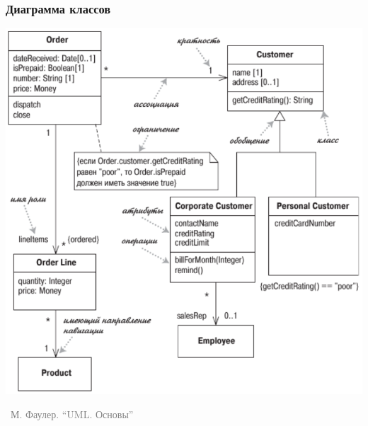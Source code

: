 \documentclass[xetex,mathserif,serif]{beamer}
\newcommand{\attribution}[1] {
	\vspace{-5mm}\begin{flushright}\begin{scriptsize}\textcolor{gray}{\textcopyright\, #1}\end{scriptsize}\end{flushright}
}
\begin{document}
	\begin{frame}
		\frametitle{Диаграмма классов}
		\begin{center}
			\includegraphics[height=0.8\textheight]{umlClassDiagram.png}
			\attribution{М. Фаулер. ``UML. Основы''}
		\end{center}
	\end{frame}
\end{document}

